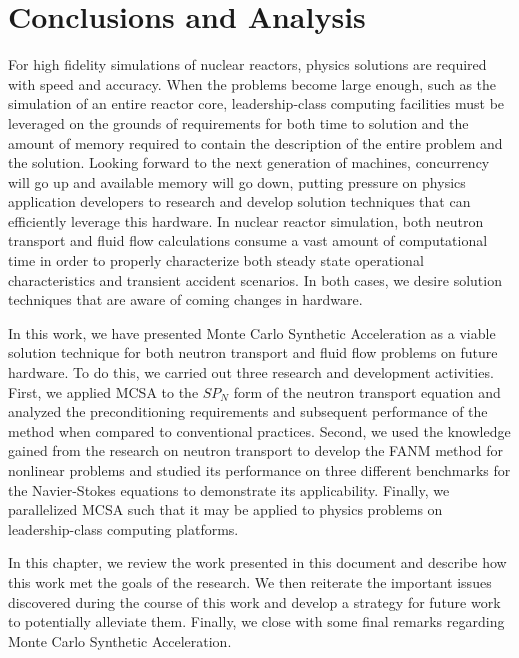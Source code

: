 \chapter{Conclusions and Analysis\ }
\label{ch:conclusion}

For high fidelity simulations of nuclear reactors, physics solutions
are required with speed and accuracy. When the problems become large
enough, such as the simulation of an entire reactor core,
leadership-class computing facilities must be leveraged on the grounds
of requirements for both time to solution and the amount of memory
required to contain the description of the entire problem and the
solution. Looking forward to the next generation of machines,
concurrency will go up and available memory will go down, putting
pressure on physics application developers to research and develop
solution techniques that can efficiently leverage this hardware. In
nuclear reactor simulation, both neutron transport and fluid flow
calculations consume a vast amount of computational time in order to
properly characterize both steady state operational characteristics
and transient accident scenarios. In both cases, we desire solution
techniques that are aware of coming changes in hardware.

In this work, we have presented Monte Carlo Synthetic Acceleration as
a viable solution technique for both neutron transport and fluid flow
problems on future hardware. To do this, we carried out three research
and development activities. First, we applied MCSA to the $SP_N$ form
of the neutron transport equation and analyzed the preconditioning
requirements and subsequent performance of the method when compared to
conventional practices. Second, we used the knowledge gained from the
research on neutron transport to develop the FANM method for nonlinear
problems and studied its performance on three different benchmarks for
the Navier-Stokes equations to demonstrate its applicability. Finally,
we parallelized MCSA such that it may be applied to physics problems
on leadership-class computing platforms.

In this chapter, we review the work presented in this document and
describe how this work met the goals of the research. We then
reiterate the important issues discovered during the course of this
work and develop a strategy for future work to potentially alleviate
them. Finally, we close with some final remarks regarding Monte Carlo
Synthetic Acceleration.

